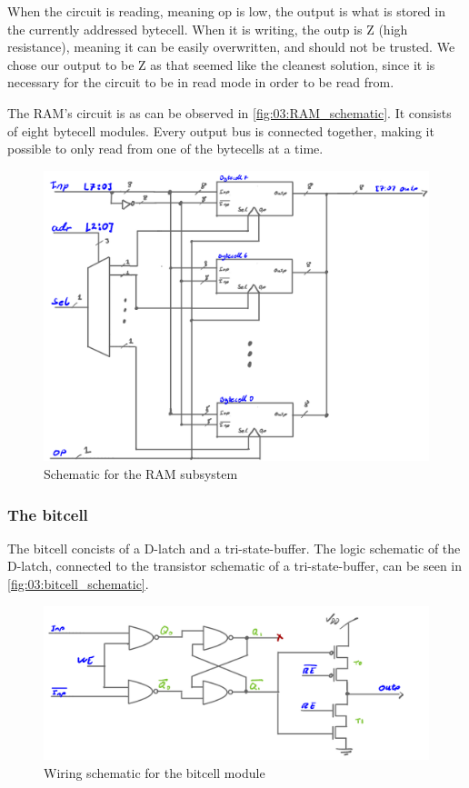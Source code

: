 When the circuit is reading, meaning op is low, the output is what is stored in the currently addressed bytecell. When it is writing, the outp is Z (high resistance), meaning it can be easily overwritten, and should not be trusted. We chose our output to be Z as that seemed like the cleanest solution, since it is necessary for the circuit to be in read mode in order to be read from.

The RAM's circuit is as can be observed in \autoref{fig:03:RAM_schematic}. It consists of eight bytecell modules. Every output bus is connected together, making it possible to only read from one of the bytecells at a time.

\begin{figure}[H]
    \centering
    \includegraphics[width=0.8\linewidth]{LaTeX_2/Figures/ram_schematic.png}
    \caption{Schematic for the RAM subsystem}
    \label{fig:03:RAM_schematic}
\end{figure}


\subsubsection{The bitcell}
The bitcell concists of a D-latch and a tri-state-buffer. The logic schematic of the D-latch, connected to the transistor schematic of a tri-state-buffer, can be seen in \autoref{fig:03:bitcell_schematic}.

\begin{figure}[H]
    \centering
    \includegraphics[width=0.8\linewidth]{LaTeX_2/Figures/bitcell_schematic.png}
    \caption{Wiring schematic for the bitcell module}
    \label{fig:03:bitcell_schematic}
\end{figure}

